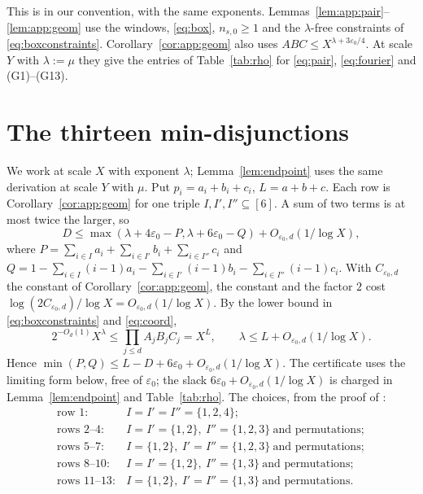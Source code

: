 \documentclass{amsart}
\theoremstyle{definition}
\theoremstyle{plain}
\numberwithin{equation}{section}
\numberwithin{table}{section}
\begin{document}
This is \cite[Proposition~4.1]{BBLT} in our convention, with the same
exponents. Lemmas~\ref{lem:app:pair}--\ref{lem:app:geom} use the windows,
\eqref{eq:box}, $n_{s,0}\ge1$ and the $\lambda$-free constraints of
\eqref{eq:boxconstraints}. Corollary~\ref{cor:app:geom} also uses
$ABC\le X^{\lambda+3\varepsilon_0/4}$. At scale $Y$ with $\lambda:=\mu$ they
give the entries of Table~\ref{tab:rho} for \eqref{eq:pair},
\eqref{eq:fourier} and (G1)--(G13).

\section{The thirteen min-disjunctions}\label{app:geom}

We work at scale $X$ with exponent $\lambda$; Lemma~\ref{lem:endpoint} uses
the same derivation at scale $Y$ with $\mu$. Put $p_i=a_i+b_i+c_i$,
$L=a+b+c$. Each row is Corollary~\ref{cor:app:geom}
for one triple $I,I',I''\subseteq[6]$. A sum of two terms is at most twice
the larger, so
\[
D\le\max(\lambda+4\varepsilon_0-P,\lambda+6\varepsilon_0-Q)
+O_{\varepsilon_0,d}(1/\log X),
\]
where
$P=\sum_{i\in I}a_i+\sum_{i\in I'}b_i+\sum_{i\in I''}c_i$ and
$Q=1-\sum_{i\in I}(i-1)a_i-\sum_{i\in I'}(i-1)b_i
 -\sum_{i\in I''}(i-1)c_i$. With $C_{\varepsilon_0,d}$ the constant of
Corollary~\ref{cor:app:geom}, the constant and the factor $2$ cost
$\log(2C_{\varepsilon_0,d})/\log X=O_{\varepsilon_0,d}(1/\log X)$. By the lower
bound in \eqref{eq:boxconstraints} and \eqref{eq:coord},
\[
 2^{-O_d(1)}X^\lambda\le\prod_{j\le d}A_jB_jC_j=X^L,
 \qquad \lambda\le L+O_{\varepsilon_0,d}(1/\log X).
\]
Hence
$\min(P,Q)\le L-D+6\varepsilon_0+O_{\varepsilon_0,d}(1/\log X)$.
The certificate uses the limiting form below, free of $\varepsilon_0$; the
slack $6\varepsilon_0+O_{\varepsilon_0,d}(1/\log X)$ is charged in
Lemma~\ref{lem:endpoint} and Table~\ref{tab:rho}. The choices, from the proof
of \cite[Theorem~1.3]{BBLT}:
\[
\begin{array}{ll}
 \text{row }1: & I=I'=I''=\{1,2,4\};\\
 \text{rows }2\text{--}4: & I=I'=\{1,2\},\ I''=\{1,2,3\}\ \text{and permutations};\\
 \text{rows }5\text{--}7: & I=\{1,2\},\ I'=I''=\{1,2,3\}\ \text{and permutations};\\
 \text{rows }8\text{--}10: & I=I'=\{1,2\},\ I''=\{1,3\}\ \text{and permutations};\\
 \text{rows }11\text{--}13: & I=\{1,2\},\ I'=I''=\{1,3\}\ \text{and permutations}.
\end{array}
\]
\end{document}
